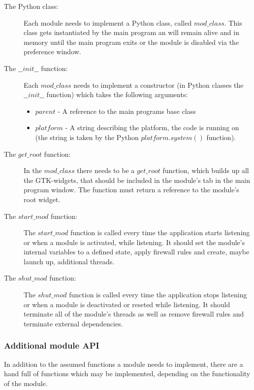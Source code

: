 \documentclass[a4paper, 11pt]{article}
\begin{document}
            \begin{description}
                \item[The Python class:] Each module needs to implement a Python class, called $mod\_class$. This class gets instantiated by the main program an will remain alive and in memory until the main program exits or the module is disabled via the preference window.
                \item[The $\_\_init\_\_$ function:] Each $mod\_class$ needs to implement a constructor (in Python classes the $\_\_init\_\_$ function) which takes the following arguments:
                    \begin{itemize}
                        \item $parent$ - A reference to the main programs base class
                        \item $platform$ - A string describing the platform, the code is running on (the string is taken by the Python $platform.system()$ function).
                    \end{itemize}
                \item[The $get\_root$ function:] In the $mod\_class$ there needs to be a $get\_root$ function, which builds up all the GTK-widgets, that should be included in the module's tab in the main program window. The function must return a reference to the module's root widget.
                \item[The $start\_mod$ function:] The $start\_mod$ function is called every time the application starts listening or when a module is activated, while listening. It should set the module's internal variables to a defined state, apply firewall rules and create, maybe launch up, additional threads.
                \item[The $shut\_mod$ function:] The $shut\_mod$ function is called every time the application stops listening or when a module is deactivated or reseted while listening. It should terminate all of the module's threads as well as remove firewall rules and terminate external dependencies.
            \end{description}

            \subsubsection{Additional module API}
            \label{module-api-add}

                In addition to the assumed functions a module needs to implement, there are a hand full of functions which may be implemented, depending on the functionality of the module.
\end{document}
